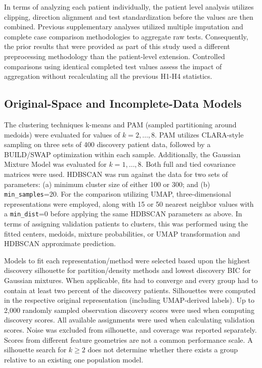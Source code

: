 In terms of analyzing each patient individually, the patient level analysis utilizes clipping, direction alignment and test standardization before the values are then combined. Previous supplementary analyses utilized multiple imputation and complete case comparison methodologies to aggregate raw tests. Consequently, the prior results that were provided as part of this study used a different preprocessing methodology than the patient-level extension. Controlled comparisons using identical completed test values assess the impact of aggregation without recalculating all the previous H1-H4 statistics.

\subsection{Original-Space and Incomplete-Data Models}

The clustering techniques k-means and PAM (sampled partitioning around medoids) were evaluated for values of $k=2,\ldots,8$. PAM utilizes CLARA-style sampling on three sets of 400 discovery patient data, followed by a BUILD/SWAP optimization within each sample. Additionally, the Gaussian Mixture Model was evaluated for $k=1,\ldots,8$. Both full and tied covariance matrices were used. HDBSCAN was run against the data for two sets of parameters: (a) minimum cluster size of either 100 or 300; and (b) \texttt{min\_samples}=20. For the comparison utilizing UMAP, three-dimensional representations were employed, along with 15 or 50 nearest neighbor values with a \texttt{min\_dist}=0 before applying the same HDBSCAN parameters as above. In terms of assigning validation patients to clusters, this was performed using the fitted centers, medoids, mixture probabilities, or UMAP transformation and HDBSCAN approximate prediction.

Models to fit each representation/method were selected based upon the highest discovery silhouette for partition/density methods and lowest discovery BIC for Gaussian mixtures. When applicable, fits had to converge and every group had to contain at least two percent of the discovery patients. Silhouettes were computed in the respective original representation (including UMAP-derived labels). Up to 2,000 randomly sampled observation discovery scores were used when computing discovery scores. All available assignments were used when calculating validation scores. Noise was excluded from silhouette, and coverage was reported separately. Scores from different feature geometries are not a common performance scale. A silhouette search for $k\geq2$ does not determine whether there exists a group relative to an existing one population model.

